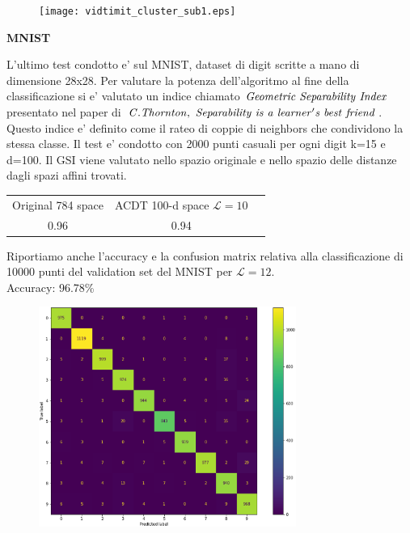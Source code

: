 \documentclass[a4, landscape]{seminar}
\theoremstyle{definition}
\def\bc{\begin{center}}
\def\ec{\end{center}}
\def\bs{\begin{slide}\begingroup\small}
\def\es{\endgroup\end{slide}}
\begin{document}
\bs
\begin{figure}[b]
\centering
\texttt{[image: vidtimit\_cluster\_sub1.eps]}
\end{figure}
\es

\bs
\bc{\bf\color{blue}MNIST}\ec
L'ultimo test condotto e' sul MNIST, dataset di digit scritte a mano di dimensione 28x28.
Per valutare la potenza dell'algoritmo al fine della classificazione si e' valutato un indice chiamato
$\it{Geometric\ Separability\ Index}$ presentato nel paper di $\it{C. Thornton,\ Separability\ is\ a\ learner's\ best\ friend}$.
Questo indice e' definito come il rateo di coppie di neighbors che condividono la stessa classe. Il test e' condotto con 2000 punti casuali per ogni digit k=15 e d=100.
Il GSI viene valutato nello spazio originale e nello spazio delle distanze dagli spazi affini trovati.
\begin{center}
    \begin{tabular}{ |c|c|c| }
    \hline
    Original 784 space & ACDT 100-d space $\mathcal{L} = 10$ \\
    0.96 & \color[HTML]{009901} 0.94 \\
    \hline
    \end{tabular}
\end{center}
\es

\bs
Riportiamo anche l'accuracy e la confusion matrix relativa alla classificazione di 10000 punti del validation set del MNIST per $\mathcal{L}=12$. \\
Accuracy: 96.78\%
\begin{figure}[b]
\centering
\includegraphics[width=0.75\textwidth]{confusionmatrix.eps}
\end{figure}
\es
\end{document}
